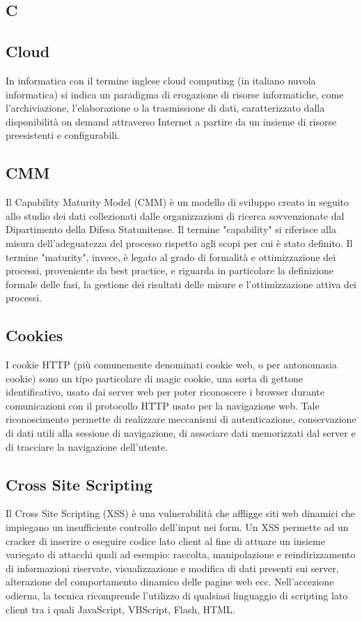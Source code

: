 \newpage

\begin{center}
\Huge\section*{\uppercase{C}}
\end{center}

\subsection*{Cloud}
In informatica con il termine inglese cloud computing (in italiano nuvola informatica) si indica un paradigma di erogazione di risorse informatiche, come l'archiviazione, l'elaborazione o la trasmissione di dati, caratterizzato dalla disponibilità on demand attraverso Internet a partire da un insieme di risorse preesistenti e configurabili.

\subsection*{CMM}
Il Capability Maturity Model (CMM) è un modello di sviluppo creato in seguito allo
studio dei dati collezionati dalle organizzazioni di ricerca sovvenzionate dal Dipartimento
della Difesa Statunitense. Il termine "capability" si riferisce alla misura dell'adeguatezza
del processo rispetto agli scopi per cui è stato definito. Il termine "maturity", invece, è
legato al grado di formalità e ottimizzazione dei processi, proveniente da best practice, e
riguarda in particolare la definizione formale delle fasi, la gestione dei risultati delle misure
e l'ottimizzazione attiva dei processi.

\subsection*{Cookies}
I cookie HTTP (più comunemente denominati cookie web, o per antonomasia cookie) sono un tipo particolare di magic cookie, una sorta di gettone identificativo, usato dai server web per poter riconoscere i browser durante comunicazioni con il protocollo HTTP usato per la navigazione web. Tale riconoscimento permette di realizzare meccanismi di autenticazione, conservazione di dati utili alla sessione di navigazione, di associare dati memorizzati dal server e di tracciare la navigazione dell'utente.

\subsection*{Cross Site Scripting}
Il Cross Site Scripting (XSS) è una vulnerabilità che affligge siti web dinamici che impiegano un insufficiente controllo dell'input nei form. Un XSS permette ad un cracker di inserire o eseguire codice lato client al fine di attuare un insieme variegato di attacchi quali ad esempio: raccolta, manipolazione e reindirizzamento di informazioni riservate, visualizzazione e modifica di dati presenti sui server, alterazione del comportamento dinamico delle pagine web ecc. Nell'accezione odierna, la tecnica ricomprende l'utilizzo di qualsiasi linguaggio di scripting lato client tra i quali JavaScript, VBScript, Flash, HTML.

